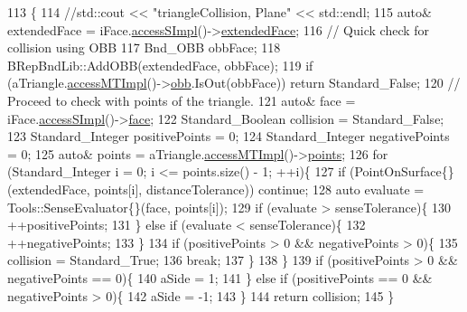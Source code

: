 \begin{DoxyCode}
113                                      \{
114     \textcolor{comment}{//std::cout << "triangleCollision, Plane" << std::endl;}
115     \textcolor{keyword}{auto}& extendedFace = iFace.\hyperlink{classMcCAD_1_1Geometry_1_1Surface_a989de1f9ebe3de043412014ed25e52eb}{accessSImpl}()->\hyperlink{classMcCAD_1_1Geometry_1_1Surface_1_1Impl_afaca81a1a3f54b93988737ac7085a0f2}{extendedFace};
116     \textcolor{comment}{// Quick check for collision using OBB}
117     Bnd\_OBB obbFace;
118     BRepBndLib::AddOBB(extendedFace, obbFace);
119     \textcolor{keywordflow}{if} (aTriangle.\hyperlink{classMcCAD_1_1Geometry_1_1MeshTriangle_abd8b4e7b4f1dc5da17651c741bc6fada}{accessMTImpl}()->\hyperlink{classMcCAD_1_1Geometry_1_1MeshTriangle_1_1Impl_a1b7bcf68b5df6bca6d87f674eb048a4d}{obb}.IsOut(obbFace)) \textcolor{keywordflow}{return} Standard\_False;
120     \textcolor{comment}{// Proceed to check with points of the triangle.}
121     \textcolor{keyword}{auto}& face = iFace.\hyperlink{classMcCAD_1_1Geometry_1_1Surface_a989de1f9ebe3de043412014ed25e52eb}{accessSImpl}()->\hyperlink{classMcCAD_1_1Geometry_1_1Surface_1_1Impl_abf7c4dc859404ce42b425c7d6b578f69}{face};
122     Standard\_Boolean collision = Standard\_False;
123     Standard\_Integer positivePoints = 0;
124     Standard\_Integer negativePoints = 0;
125     \textcolor{keyword}{auto}& points = aTriangle.\hyperlink{classMcCAD_1_1Geometry_1_1MeshTriangle_abd8b4e7b4f1dc5da17651c741bc6fada}{accessMTImpl}()->\hyperlink{classMcCAD_1_1Geometry_1_1MeshTriangle_1_1Impl_ab03401cf518b9b9576fdf1807a1db4bc}{points};
126     \textcolor{keywordflow}{for} (Standard\_Integer i = 0; i <= points.size() - 1; ++i)\{
127         \textcolor{keywordflow}{if} (PointOnSurface\{\}(extendedFace, points[i], distanceTolerance)) \textcolor{keywordflow}{continue};
128         \textcolor{keyword}{auto} evaluate = Tools::SenseEvaluator\{\}(face, points[i]);
129         \textcolor{keywordflow}{if} (evaluate > senseTolerance)\{
130             ++positivePoints;
131         \} \textcolor{keywordflow}{else} \textcolor{keywordflow}{if} (evaluate < senseTolerance)\{
132             ++negativePoints;
133         \}
134         \textcolor{keywordflow}{if} (positivePoints > 0 && negativePoints > 0)\{
135             collision = Standard\_True;
136             \textcolor{keywordflow}{break};
137         \}
138     \}
139     \textcolor{keywordflow}{if} (positivePoints > 0 && negativePoints == 0)\{
140         aSide = 1;
141     \} \textcolor{keywordflow}{else} \textcolor{keywordflow}{if} (positivePoints == 0 && negativePoints > 0)\{
142         aSide = -1;
143     \}
144     \textcolor{keywordflow}{return} collision;
145 \}
\end{DoxyCode}
